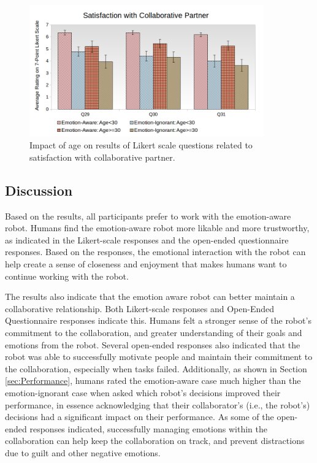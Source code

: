 \documentclass[12pt]{report}
\begin{document}
\begin{figure}[!h]
\centering
\includegraphics[width=0.9\textwidth]{figure/Age-Satisfaction.png}
\caption{Impact of age on results of Likert scale questions related to
satisfaction with collaborative partner.}
\label{fig:age-satisfaction}
\end{figure}

\subsection{Discussion}
Based on the results, all participants prefer to work with the emotion-aware
robot. Humans find the emotion-aware robot more likable and more trustworthy, as
indicated in the Likert-scale responses and the open-ended questionnaire
responses. Based on the responses, the emotional interaction with the robot can
help create a sense of closeness and enjoyment that makes humans want to
continue working with the robot.

The results also indicate that the emotion aware robot can better maintain a
collaborative relationship. Both Likert-scale responses and Open-Ended
Questionnaire responses indicate this. Humans felt a stronger sense of the
robot's commitment to the collaboration, and greater understanding of their
goals and emotions from the robot. Several open-ended responses also indicated
that the robot was able to successfully motivate people and maintain their
commitment to the collaboration, especially when tasks failed. Additionally, as
shown in Section \ref{sec:Performance}, humans rated the emotion-aware case much
higher than the emotion-ignorant case when asked which robot's decisions
improved their performance, in essence acknowledging that their collaborator's
(i.e., the robot's) decisions had a significant impact on their performance. As
some of the open-ended responses indicated, successfully managing emotions
within the collaboration can help keep the collaboration on track, and prevent
distractions due to guilt and other negative emotions.
\end{document}
